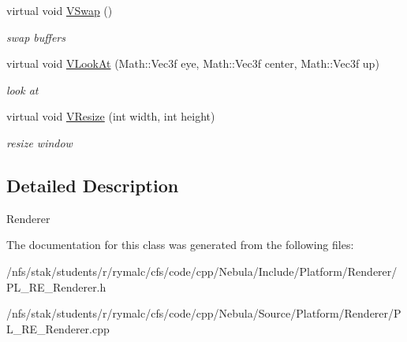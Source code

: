 \begin{DoxyCompactItemize}
\item 
\hypertarget{classPlatform_1_1Renderer_1_1Renderer_a98adb029f092ed025e6ac6bd0d7dd808}{
virtual void \hyperlink{classPlatform_1_1Renderer_1_1Renderer_a98adb029f092ed025e6ac6bd0d7dd808}{VSwap} ()}
\label{classPlatform_1_1Renderer_1_1Renderer_a98adb029f092ed025e6ac6bd0d7dd808}

\begin{DoxyCompactList}\small\item\em swap buffers \item\end{DoxyCompactList}\item 
\hypertarget{classPlatform_1_1Renderer_1_1Renderer_aa1bf4e5d1b97c3d418354b614e7e8fff}{
virtual void \hyperlink{classPlatform_1_1Renderer_1_1Renderer_aa1bf4e5d1b97c3d418354b614e7e8fff}{VLookAt} (Math::Vec3f eye, Math::Vec3f center, Math::Vec3f up)}
\label{classPlatform_1_1Renderer_1_1Renderer_aa1bf4e5d1b97c3d418354b614e7e8fff}

\begin{DoxyCompactList}\small\item\em look at \item\end{DoxyCompactList}\item 
\hypertarget{classPlatform_1_1Renderer_1_1Renderer_aa6953a47246902eec2296dbd1e43ba06}{
virtual void \hyperlink{classPlatform_1_1Renderer_1_1Renderer_aa6953a47246902eec2296dbd1e43ba06}{VResize} (int width, int height)}
\label{classPlatform_1_1Renderer_1_1Renderer_aa6953a47246902eec2296dbd1e43ba06}

\begin{DoxyCompactList}\small\item\em resize window \item\end{DoxyCompactList}\end{DoxyCompactItemize}


\subsection{Detailed Description}
Renderer 

The documentation for this class was generated from the following files:\begin{DoxyCompactItemize}
\item 
/nfs/stak/students/r/rymalc/cfs/code/cpp/Nebula/Include/Platform/Renderer/PL\_\-RE\_\-Renderer.h\item 
/nfs/stak/students/r/rymalc/cfs/code/cpp/Nebula/Source/Platform/Renderer/PL\_\-RE\_\-Renderer.cpp\end{DoxyCompactItemize}
